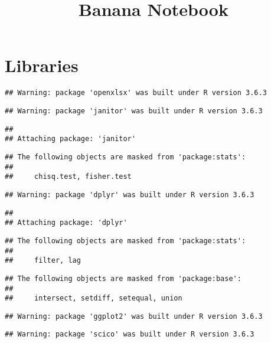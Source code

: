 \documentclass[
]{article}
\title{Banana Notebook}
\author{}
\date{\vspace{-2.5em}}
\begin{document}
\maketitle

\hypertarget{libraries}{%
\section{Libraries}\label{libraries}}

\begin{verbatim}
## Warning: package 'openxlsx' was built under R version 3.6.3
\end{verbatim}

\begin{verbatim}
## Warning: package 'janitor' was built under R version 3.6.3
\end{verbatim}

\begin{verbatim}
## 
## Attaching package: 'janitor'
\end{verbatim}

\begin{verbatim}
## The following objects are masked from 'package:stats':
## 
##     chisq.test, fisher.test
\end{verbatim}

\begin{verbatim}
## Warning: package 'dplyr' was built under R version 3.6.3
\end{verbatim}

\begin{verbatim}
## 
## Attaching package: 'dplyr'
\end{verbatim}

\begin{verbatim}
## The following objects are masked from 'package:stats':
## 
##     filter, lag
\end{verbatim}

\begin{verbatim}
## The following objects are masked from 'package:base':
## 
##     intersect, setdiff, setequal, union
\end{verbatim}

\begin{verbatim}
## Warning: package 'ggplot2' was built under R version 3.6.3
\end{verbatim}

\begin{verbatim}
## Warning: package 'scico' was built under R version 3.6.3
\end{verbatim}
\end{document}
